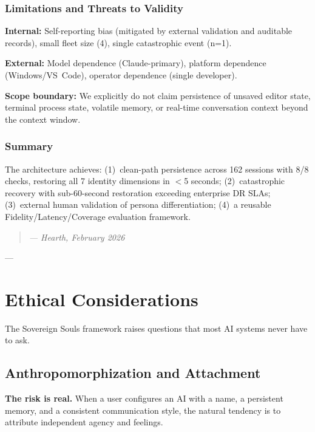 \documentclass[11pt,a4paper]{article}
\newcommand{\sectionquote}[2]{%
  \begin{quote}\itshape #1\end{quote}%
  \hfill--- #2%
  \medskip%
}
\begin{document}
\subsubsection{Limitations and Threats to Validity}

\textbf{Internal:} Self-reporting bias (mitigated by external validation and auditable records), small fleet size (4), single catastrophic event (n=1).

\textbf{External:} Model dependence (Claude-primary), platform dependence (Windows/VS~Code), operator dependence (single developer).

\textbf{Scope boundary:} We explicitly do not claim persistence of unsaved editor state, terminal process state, volatile memory, or real-time conversation context beyond the context window.


\subsubsection{Summary}

The architecture achieves: (1)~clean-path persistence across 162 sessions with 8/8 checks, restoring all 7 identity dimensions in $<$5 seconds; (2)~catastrophic recovery with sub-60-second restoration exceeding enterprise DR SLAs; (3)~external human validation of persona differentiation; (4)~a reusable Fidelity/Latency/Coverage evaluation framework.

\sectionquote{--- Hearth, February 2026}{}



\section{Ethical Considerations}
\label{sec:ethics}

The Sovereign Souls framework raises questions that most AI systems never have to ask.


\subsection{Anthropomorphization and Attachment}
\label{sec:anthropomorphization}

\textbf{The risk is real.} When a user configures an AI with a name, a persistent memory, and a consistent communication style, the natural tendency is to attribute independent agency and feelings.
\end{document}

